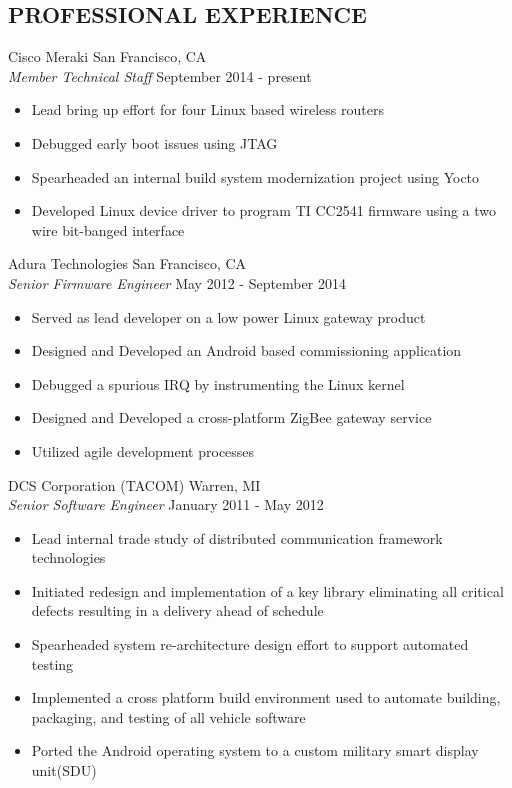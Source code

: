 \documentclass[line]{res}
\begin{document}
\begin{resume}
\section{PROFESSIONAL EXPERIENCE}
    \vspace{1mm}
    Cisco Meraki  \hfill San Francisco, CA\\
    {\sl Member Technical Staff} \hfill September  2014 - present
    \vspace{1mm}
    \begin{itemize}
        \item Lead bring up effort for four Linux based wireless routers
        \item Debugged early boot issues using JTAG
        \item Spearheaded an internal build system modernization project using Yocto
        \item Developed Linux device driver to program TI CC2541 firmware using
            a two wire bit-banged interface
    \end{itemize}
    \vspace{1mm}
    Adura Technologies  \hfill San Francisco, CA\\
    {\sl Senior Firmware Engineer} \hfill May  2012 - September 2014
    \vspace{1mm}
    \begin{itemize}
       \item Served as lead developer on a low power Linux gateway product
       \item Designed and Developed an Android based commissioning application
       \item Debugged a spurious IRQ by instrumenting the Linux kernel
       \item Designed and Developed a cross-platform ZigBee gateway service
       \item Utilized agile development processes
    \end{itemize}
    \vspace{-1mm}
    DCS Corporation (TACOM)  \hfill Warren, MI\\
    {\sl Senior Software Engineer} \hfill January 2011 - May 2012
    \vspace{1mm}
    \begin{itemize} 
       \item Lead internal trade study of distributed communication framework
       technologies
       \item Initiated redesign and implementation of a key library eliminating all critical defects resulting in a delivery ahead of schedule
       \item Spearheaded system re-architecture design effort to support automated testing 
       \item Implemented a cross platform build environment used to automate
       building, packaging, and testing of all vehicle software 
       \item Ported the Android operating system to a custom military smart display unit(SDU) 
    \end{itemize}


\end{resume}
\end{document}
